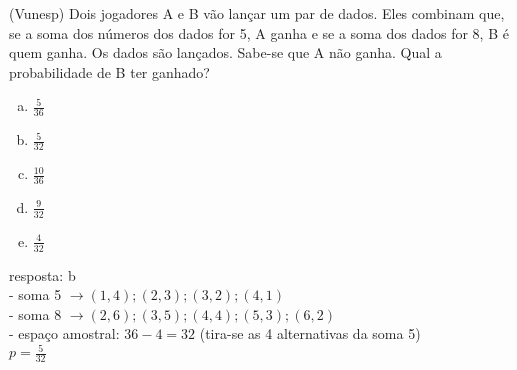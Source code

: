 \begin{ex}
(Vunesp) Dois jogadores A e B vão lançar um par de dados. Eles combinam que, se a soma dos números dos dados for 5, A ganha e se a soma dos dados for 8, B é quem ganha. Os dados são lançados. Sabe-se que A não ganha. Qual a probabilidade de B ter ganhado?
    \begin{enumerate}[(a)]
    \item $\frac{5}{36}$
    \item $\frac{5}{32}$
    \item $\frac{10}{36}$
    \item $\frac{9}{32}$
    \item $\frac{4}{32}$
    \end{enumerate}
      \begin{sol}
      resposta: b  \\
      - soma 5 $\rightarrow(1,4);(2,3);(3,2);(4,1)$\\
      - soma 8 $\rightarrow(2,6);(3,5);(4,4);(5,3);(6,2)$  \\
      - espaço amostral: $36-4=32$ (tira-se as 4 alternativas da soma 5) \\
      $p=\frac{5}{32}$
      
      \end{sol}
\end{ex}